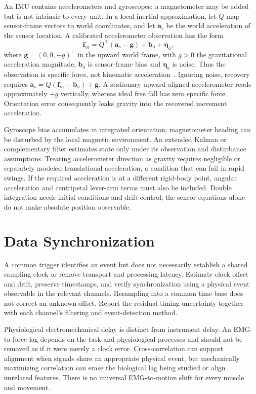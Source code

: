 An IMU contains accelerometers and gyroscopes; a magnetometer may be added but is not intrinsic to every unit.
In a local inertial approximation, let $Q$ map sensor-frame vectors to world coordinates, and let $\bm a_s$ be the world acceleration of the sensor location.
A calibrated accelerometer observation has the form
\[
\bm f_m=Q^\top(\bm a_s-\bm g)+\bm b_a+\bm\eta_a,
\]
where $\bm g=(0,0,-g)^\top$ in the upward world frame, with $g>0$ the gravitational acceleration magnitude, $\bm b_a$ is sensor-frame bias and $\bm\eta_a$ is noise.
Thus the observation is specific force, not kinematic acceleration~\cite{AnalogDevicesInertialExperimental}.
Ignoring noise, recovery requires $\bm a_s=Q(\bm f_m-\bm b_a)+\bm g$.
A stationary upward-aligned accelerometer reads approximately $+g$ vertically, whereas ideal free fall has zero specific force.
Orientation error consequently leaks gravity into the recovered movement acceleration.

Gyroscope bias accumulates in integrated orientation; magnetometer heading can be disturbed by the local magnetic environment.
An extended Kalman or complementary filter estimates state only under its observation and disturbance assumptions.
Treating accelerometer direction as gravity requires negligible or separately modeled translational acceleration, a condition that can fail in rapid swings.
If the required acceleration is at a different rigid-body point, angular acceleration and centripetal lever-arm terms must also be included.
Double integration needs initial conditions and drift control; the sensor equations alone do not make absolute position observable.

\section{Data Synchronization}

A common trigger identifies an event but does not necessarily establish a shared sampling clock or remove transport and processing latency.
Estimate clock offset and drift, preserve timestamps, and verify synchronization using a physical event observable in the relevant channels.
Resampling into a common time base does not correct an unknown offset.
Report the residual timing uncertainty together with each channel's filtering and event-detection method.

Physiological electromechanical delay is distinct from instrument delay.
An EMG-to-force lag depends on the task and physiological processes and should not be removed as if it were merely a clock error.
Cross-correlation can support alignment when signals share an appropriate physical event, but mechanically maximizing correlation can erase the biological lag being studied or align unrelated features.
There is no universal EMG-to-motion shift for every muscle and movement.

